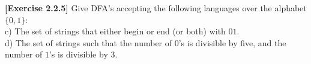 \textbf{[Exercise 2.2.5]} Give DFA's accepting the following languages 
over the alphabet $\{0,1\}$:\\
c) The set of strings that either begin or end (or both) with $01$.\\
d) The set of strings such that the number of $0$'s is divisible by five, 
and the number of $1$'s is divisible by 3.
